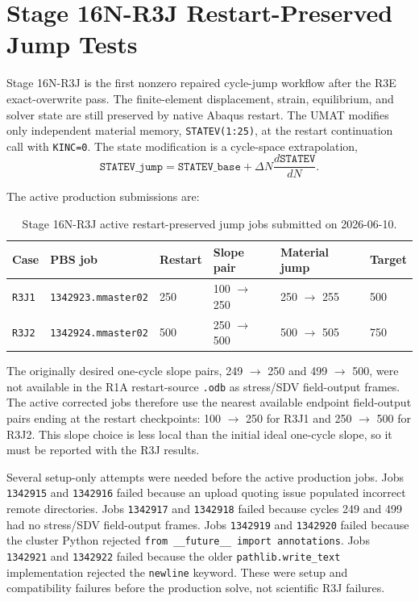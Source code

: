 \documentclass[11pt,a4paper]{article}
\newcommand{\code}[1]{\texttt{#1}}
\begin{document}
\section{Stage 16N-R3J Restart-Preserved Jump Tests}

Stage 16N-R3J is the first nonzero repaired cycle-jump workflow after the R3E exact-overwrite pass. The finite-element displacement, strain, equilibrium, and solver state are still preserved by native Abaqus restart. The UMAT modifies only independent material memory, \code{STATEV(1:25)}, at the restart continuation call with \code{KINC=0}. The state modification is a cycle-space extrapolation,
\[
\code{STATEV\_jump} = \code{STATEV\_base} + \Delta N \frac{d\code{STATEV}}{dN}.
\]

The active production submissions are:

\begin{table}[H]
\centering
\caption{Stage 16N-R3J active restart-preserved jump jobs submitted on 2026-06-10.}
\begin{tabular}{llllll}
\toprule
Case & PBS job & Restart & Slope pair & Material jump & Target \\
\midrule
\code{R3J1} & \code{1342923.mmaster02} & 250 & 100 $\rightarrow$ 250 & 250 $\rightarrow$ 255 & 500 \\
\code{R3J2} & \code{1342924.mmaster02} & 500 & 250 $\rightarrow$ 500 & 500 $\rightarrow$ 505 & 750 \\
\bottomrule
\end{tabular}
\end{table}

The originally desired one-cycle slope pairs, 249 $\rightarrow$ 250 and 499 $\rightarrow$ 500, were not available in the R1A restart-source \code{.odb} as stress/SDV field-output frames. The active corrected jobs therefore use the nearest available endpoint field-output pairs ending at the restart checkpoints: 100 $\rightarrow$ 250 for R3J1 and 250 $\rightarrow$ 500 for R3J2. This slope choice is less local than the initial ideal one-cycle slope, so it must be reported with the R3J results.

Several setup-only attempts were needed before the active production jobs. Jobs \code{1342915} and \code{1342916} failed because an upload quoting issue populated incorrect remote directories. Jobs \code{1342917} and \code{1342918} failed because cycles 249 and 499 had no stress/SDV field-output frames. Jobs \code{1342919} and \code{1342920} failed because the cluster Python rejected \code{from \_\_future\_\_ import annotations}. Jobs \code{1342921} and \code{1342922} failed because the older \code{pathlib.write\_text} implementation rejected the \code{newline} keyword. These were setup and compatibility failures before the production solve, not scientific R3J failures.
\end{document}
